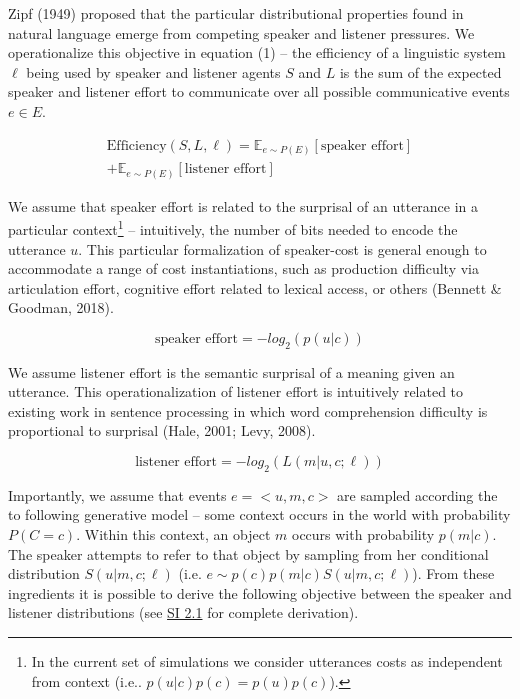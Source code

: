 \documentclass[10pt, letterpaper]{article}
\begin{document}
Zipf (1949) proposed that the particular distributional properties found
in natural language emerge from competing speaker and listener
pressures. We operationalize this objective in equation (1) -- the
efficiency of a linguistic system \(\ell\) being used by speaker and
listener agents \(S\) and \(L\) is the sum of the expected speaker and
listener effort to communicate over all possible communicative events
\(e \in E\).\par

\begin{equation}
\begin{split}
  \text{Efficiency}(S, L, \ell) = \mathbb{E}_{e \sim P(E)}[\text{speaker effort}] \\+ \mathbb{E}_{e \sim P(E)}[\text{listener effort}]
\end{split}
\end{equation}

We assume that speaker effort is related to the surprisal of an
utterance in a particular
context\footnote{In the current set of simulations we consider utterances costs as independent from context (i.e.. $p(u|c)p(c)=p(u)p(c)$).}
-- intuitively, the number of bits needed to encode the utterance \(u\).
This particular formalization of speaker-cost is general enough to
accommodate a range of cost instantiations, such as production
difficulty via articulation effort, cognitive effort related to lexical
access, or others (Bennett \& Goodman, 2018).\par

\[\text{speaker effort} = -log_2(p(u|c))\]

We assume listener effort is the semantic surprisal of a meaning given
an utterance. This operationalization of listener effort is intuitively
related to existing work in sentence processing in which word
comprehension difficulty is proportional to surprisal (Hale, 2001; Levy,
2008).

\[\text{listener effort} = -log_2(L(m|u, c; \ell))\]

Importantly, we assume that events \(e = <u, m, c>\) are sampled
according the to following generative model -- some context occurs in
the world with probability \(P(C=c)\). Within this context, an object
\(m\) occurs with probability \(p(m|c)\). The speaker attempts to refer
to that object by sampling from her conditional distribution
\(S(u|m, c; \ell)\) (i.e. \(e \sim p(c)p(m|c)S(u|m, c; \ell)\)). From
these ingredients it is possible to derive the following objective
between the speaker and listener distributions (see
\href{https://bit.ly/2RBSGcU}{SI 2.1} for complete derivation).
\end{document}
